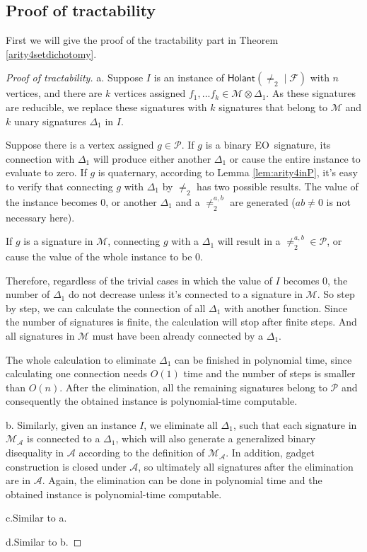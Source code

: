 \documentclass[a4paper,UKenglish,cleveref, autoref, thm-restate]{lipics-v2021}
\newcommand{\hol}[0]{\textsf{Holant}}
\newcommand{\eo}[0]{\textsf{EO}}
\begin{document}
\subsection{Proof of tractability} \label{subsection:4aritysetalgorithm}
First we will give the proof of the tractability part in Theorem \ref{arity4setdichotomy}.
\begin{proof}[Proof of tractability]
a. 
Suppose $I$ is an instance of $\hol(\neq_2\mid\mathcal{F})$ with $n$ vertices, and there are $k$ vertices assigned $f_1,...f_k\in\mathscr{M}\otimes\Delta_1$. As these signatures are reducible, we replace these signatures with $k$ signatures that belong to $\mathscr{M}$ and $k$ unary signatures $\Delta_1$ in $I$.

Suppose there is a vertex assigned $g\in\mathscr{P}$. 
 If $g$ is a binary \eo\ signature, its connection with $\Delta_1$ will produce either another $\Delta_1$ or cause the entire instance to evaluate to zero.
If $g$ is quaternary, according to Lemma \ref{lem:arity4inP}, it's easy to verify that connecting $g$ with $\Delta_1$ by $\neq_2$ has two possible results. The value of the instance becomes 0, or another $\Delta_1$ and a $\neq_2^{a,b}$ are generated ($ab\neq 0$ is not necessary here).

If $g$ is a signature in $\mathscr{M}$, connecting $g$ with a $\Delta_1$ will result in a $\neq_2^{a,b}\in \mathscr{P}$, or cause the value of the whole instance to be 0.

Therefore, regardless of the trivial cases in which the value of $I$ becomes 0, the number of $\Delta_1$ do not decrease unless it's connected to a signature in $\mathscr{M}$. So step by step, we can calculate the connection of all $\Delta_1$ with another function. Since the number of signatures is finite, the calculation will stop after finite steps. And all signatures in $\mathscr{M}$ must have been already connected by a $\Delta_1$. 

The whole calculation to eliminate $\Delta_1$ can be finished in polynomial time, since calculating one connection needs $O(1)$ time and the number of steps is smaller than $O(n)$. After the elimination, all the remaining signatures belong to $\mathscr{P}$ and consequently the obtained instance is polynomial-time computable.

b.
Similarly, given an instance $I$, we eliminate all $\Delta_1$, such that each  signature in $\mathscr{M}_\mathscr A$ is connected to a $\Delta_1$, which will also generate a generalized binary disequality in $\mathscr{A}$ according to the definition of $\mathscr{M}_\mathscr A$. In addition, gadget construction is closed under $\mathscr{A}$, so ultimately all signatures after the elimination are in $\mathscr{A}$. Again, the elimination can be done in polynomial time and the obtained instance is polynomial-time computable.

c.Similar to a.

d.Similar to b.
\end{proof}
\end{document}
